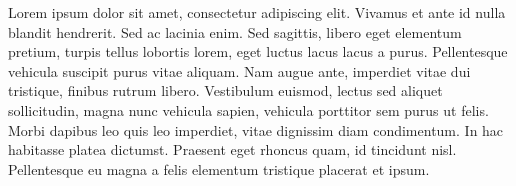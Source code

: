 Lorem ipsum dolor sit amet, consectetur adipiscing elit. Vivamus et ante id nulla blandit hendrerit. Sed ac lacinia enim. Sed sagittis, libero eget elementum pretium, turpis tellus lobortis lorem, eget luctus lacus lacus a purus. Pellentesque vehicula suscipit purus vitae aliquam. Nam augue ante, imperdiet vitae dui tristique, finibus rutrum libero. Vestibulum euismod, lectus sed aliquet sollicitudin, magna nunc vehicula sapien, vehicula porttitor sem purus ut felis. Morbi dapibus leo quis leo imperdiet, vitae dignissim diam condimentum. In hac habitasse platea dictumst. Praesent eget rhoncus quam, id tincidunt nisl. Pellentesque eu magna a felis elementum tristique placerat et ipsum.